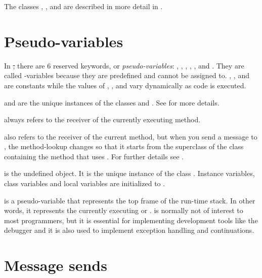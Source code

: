 \documentclass[a4paper,10pt,twoside]{book}
\begin{document}
The classes , ,  and  are described in more detail in .


\section{Pseudo-variables}

In \st, there are 6 reserved keywords, or \emph{pseudo-variables}:
, ,  ,  , , and .
They are called -variables because they are predefined and cannot be assigned to.
, , and  are constants while the values of , , and  vary dynamically as code is executed.

 and  are the unique instances of the  classes  and .
See  for more details.

 always refers to the receiver of the currently executing method.

 also refers to the receiver of the current method, but when you send a message to \super, the method-lookup changes so that it starts from the superclass of the class containing the method that uses .
For further details see .

 is the undefined object.
It is the unique instance of the class . 
Instance variables, class variables and local variables are initialized to .

 is a pseudo-variable that represents the top frame of the run-time stack.
In other words, it represents the currently executing  or .
 is normally not of interest to most programmers, but it is essential for implementing development tools like the debugger and it is also used to implement exception handling and continuations.

\section{Message sends}
\end{document}
